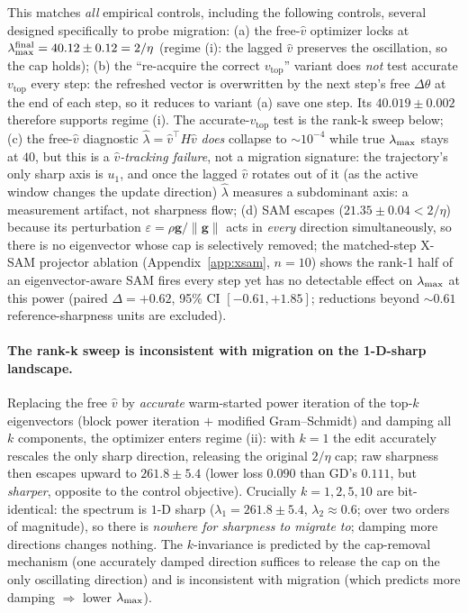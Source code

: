 This matches \emph{all} empirical controls, including the following
controls, several designed specifically to probe migration:
(a) the free-$\hat v$ optimizer locks at $\lambda_{\max}^{\mathrm{final}}=40.12\pm0.12=2/\eta$
(regime (i): the lagged $\hat v$ preserves the oscillation, so the cap holds);
(b) the ``re-acquire the correct $v_{\mathrm{top}}$'' variant does \emph{not}
test accurate $v_{\mathrm{top}}$ every step: the refreshed vector is overwritten
by the next step's free $\Delta\theta$ at the end of each step, so it reduces to
variant (a) save one step. Its $40.019\pm0.002$ therefore supports regime (i).
The accurate-$v_{\mathrm{top}}$ test is the rank-k sweep below;
(c) the free-$\hat v$ diagnostic $\hat\lambda=\hat v^{\!\top}\!H\hat v$
\emph{does} collapse to $\sim\!10^{-4}$ while true $\lambda_{\max}$ stays at $40$, but
this is a \emph{$\hat v$-tracking failure}, not a migration signature: the
trajectory's only sharp axis is $u_{1}$, and once the lagged $\hat v$ rotates
out of it (as the active window changes the update direction) $\hat\lambda$
measures a subdominant axis: a measurement artifact, not sharpness flow;
(d) SAM escapes ($21.35\pm0.04<2/\eta$) because its perturbation
$\varepsilon=\rho\mathbf{g}/\|\mathbf{g}\|$ acts in \emph{every} direction
simultaneously, so there is no eigenvector whose cap is selectively removed;
the matched-step X-SAM projector ablation (Appendix~\ref{app:xsam}, $n{=}10$) shows the rank-1 half
of an eigenvector-aware SAM fires every step yet has no detectable effect on
$\lambda_{\max}$ at this power (paired $\Delta{=}+0.62$, 95\% CI $[-0.61,+1.85]$;
reductions beyond ${\sim}0.61$ reference-sharpness units are excluded).

\paragraph{The rank-k sweep is inconsistent with migration on the 1-D-sharp landscape.}
Replacing the free $\hat v$ by \emph{accurate} warm-started power iteration of
the top-$k$ eigenvectors (block power iteration $+$ modified Gram--Schmidt) and
damping all $k$ components, the optimizer enters regime (ii): with $k\!=\!1$ the edit accurately
rescales the only sharp direction, releasing the original $2/\eta$ cap; raw
sharpness then escapes upward to $261.8\pm5.4$ (lower loss $0.090$ than GD's
$0.111$, but \emph{sharper}, opposite to the control objective). Crucially
$k\!=\!1,2,5,10$ are bit-identical: the spectrum is $1$-D sharp
($\lambda_{1}\!=\!261.8\!\pm\!5.4$, $\lambda_{2}\!\approx\!0.6$; over two
orders of magnitude), so there is \emph{nowhere for sharpness to migrate to}; damping
more directions changes nothing. The $k$-invariance is predicted by the
cap-removal mechanism (one accurately damped direction suffices to release
the cap on the only oscillating direction) and is inconsistent with migration (which predicts more damping
$\Rightarrow$ lower $\lambda_{\max}$).


